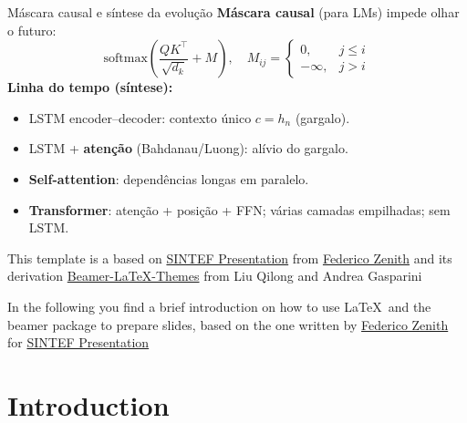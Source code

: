 \documentclass{beamer}
\newcommand{\hrefcol}[2]{\textcolor{cyan}{\href{#1}{#2}}}
\begin{document}
\begin{frame}{Máscara causal e síntese da evolução}
\textbf{Máscara causal} (para LMs) impede olhar o futuro:
\[
\mathrm{softmax}\!\left(\frac{QK^\top}{\sqrt{d_k}}+M\right),
\quad
M_{ij}=\begin{cases}
0,& j\le i\\
-\infty,& j>i
\end{cases}
\]
\textbf{Linha do tempo (síntese):}
\begin{itemize}
  \item LSTM encoder--decoder: contexto único $c=h_n$ (gargalo).
  \item LSTM + \textbf{atenção} (Bahdanau/Luong): alívio do gargalo.
  \item \textbf{Self-attention}: dependências longas em paralelo.
  \item \textbf{Transformer}: atenção + posição + FFN; várias camadas empilhadas; sem LSTM.
\end{itemize}
\end{frame}

\begin{frame}

This template is a based on \hrefcol{https://www.overleaf.com/latex/templates/sintef-presentation/jhbhdffczpnx}{SINTEF Presentation} from \hrefcol{mailto:federico.zenith@sintef.no}{Federico Zenith} and its derivation \hrefcol{https://github.com/TOB-KNPOB/Beamer-LaTeX-Themes}{Beamer-LaTeX-Themes} from Liu Qilong and Andrea Gasparini

\vspace{\baselineskip}

In the following you find a brief introduction on how to use \LaTeX\ and the beamer package to prepare slides, based on the one written by \hrefcol{mailto:federico.zenith@sintef.no}{Federico Zenith} for \hrefcol{https://www.overleaf.com/latex/templates/sintef-presentation/jhbhdffczpnx}{SINTEF Presentation}


\end{frame}

\section{Introduction}
\end{document}

